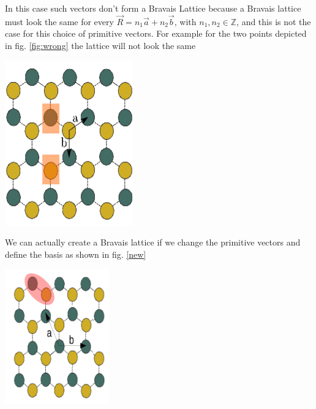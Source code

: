 \begin{questions}
\begin{solution}
  In this case such vectors don't form a Bravais Lattice because a Bravais lattice must look the same for every $\vec{R} = n_1\vec{a} + n_2 \vec{b}$, with $n_1,n_2\in \mathbb{Z}$, and this is not the case for this choice of primitive vectors.
  For example for the two points depicted in fig. \ref{fig:wrong} the lattice will not look the same
\begin{center}
  \includegraphics[width=55mm]{exa}
\end{center}
\label{fig:wrong}

\end{solution}

\begin{solution}

We can actually create a Bravais lattice if we change the primitive vectors and define the basis as shown in fig. \ref{new}
\clearpage
\begin{center}
  \includegraphics[width=45mm]{lat}
\end{center}


\end{solution}
\end{questions}
